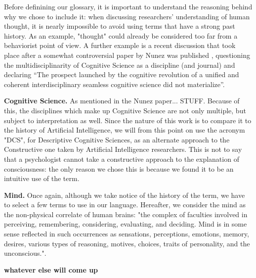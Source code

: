 \documentclass[../main.tex]{subfiles}
\begin{document}
Before definining our glossary, it is important to understand the reasoning behind why we chose to include it: when discussing researchers' understanding of human thought, it is nearly impossible to avoid using terms that have a strong past history. As an example, "thought" could already be considered too far from a behaviorist point of view. A further example is a recent discussion that took place after a somewhat controversial paper by Nunez was published \cite{nunezWhatHappenedCognitive2019}, questioning the multidisciplinarity of Cognitive Science as a discipline (and journal) and declaring \enquote{The prospect launched by the cognitive revolution of a unified and coherent interdisciplinary seamless cognitive science did not materialize}.


\vspace{5pt}
\textbf{Cognitive Science.} As mentioned in the Nunez paper... STUFF. Because of this, the disciplines which make up Cognitive Science are not only multiple, but subject to interpretation as well. Since the nature of this work is to compare it to the history of Artificial Intelligence, we will from this point on use the acronym "DCS", for Descriptive Cognitive Sciences, as an alternate approach to the Constructive one taken by Artificial Intelligence researchers. This is not to say that a psychologist cannot take a constructive approach to the explanation of consciousness: the only reason we chose this is because we found it to be an intuitive use of the term.

\vspace{5pt}
\textbf{Mind.} Once again, although we take notice of the history of the term, we have to select a few terms to use in our language. Hereafter, we consider the mind as the non-physical correlate of human brains: "the complex of faculties involved in perceiving, remembering, considering, evaluating, and deciding. Mind is in some sense reflected in such occurrences as sensations, perceptions, emotions, memory, desires, various types of reasoning, motives, choices, traits of personality, and the unconscious."\cite{Mind}.

\vspace{5pt}
\textbf{whatever else will come up}
\end{document}
